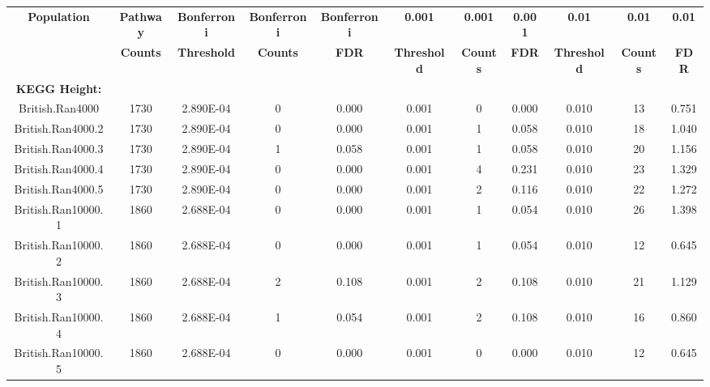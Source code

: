 \documentclass[12pt,a4paper]{article}
\begin{document}

\setlength{\footskip}{4cm}
\begin{landscape}
\begin{table}[ht]
\vspace*{-1.25cm}
\centering
\hspace*{-3.25cm}
\begin{tabular}{ccccccccccc}
  \hline
\textbf{Population} & \textbf{Pathway} & \textbf{Bonferroni} & \textbf{Bonferroni} & \textbf{Bonferroni} & \textbf{0.001} & \textbf{0.001} & \textbf{0.001} & \textbf{0.01} & \textbf{0.01} & \textbf{0.01} \\
 & \textbf{Counts} & \textbf{Threshold} & \textbf{Counts} & \textbf{FDR} & \textbf{Threshold} & \textbf{Counts} & \textbf{FDR} & \textbf{Threshold} & \textbf{Counts} & \textbf{FDR} \\ 
  \hline
\textbf{KEGG Height:} & & & & & & & & & \\
British.Ran4000 & 1730 & 2.890E-04 & 0 & 0.000 & 0.001 & 0 & 0.000 & 0.010 & 13 & 0.751 \\
  British.Ran4000.2 & 1730 & 2.890E-04 & 0 & 0.000 & 0.001 & 1 & 0.058 & 0.010 & 18 & 1.040 \\
  British.Ran4000.3 & 1730 & 2.890E-04 & 1 & 0.058 & 0.001 & 1 & 0.058 & 0.010 & 20 & 1.156 \\
  British.Ran4000.4 & 1730 & 2.890E-04 & 0 & 0.000 & 0.001 & 4 & 0.231 & 0.010 & 23 & 1.329 \\
  British.Ran4000.5 & 1730 & 2.890E-04 & 0 & 0.000 & 0.001 & 2 & 0.116 & 0.010 & 22 & 1.272 \\
  British.Ran10000.1 & 1860 & 2.688E-04 & 0 & 0.000 & 0.001 & 1 & 0.054 & 0.010 & 26 & 1.398 \\
  British.Ran10000.2 & 1860 & 2.688E-04 & 0 & 0.000 & 0.001 & 1 & 0.054 & 0.010 & 12 & 0.645 \\
  British.Ran10000.3 & 1860 & 2.688E-04 & 2 & 0.108 & 0.001 & 2 & 0.108 & 0.010 & 21 & 1.129 \\
  British.Ran10000.4 & 1860 & 2.688E-04 & 1 & 0.054 & 0.001 & 2 & 0.108 & 0.010 & 16 & 0.860 \\
  British.Ran10000.5 & 1860 & 2.688E-04 & 0 & 0.000 & 0.001 & 0 & 0.000 & 0.010 & 12 & 0.645 \\

\end{tabular}
\end{table}
\end{landscape}
\end{document}
